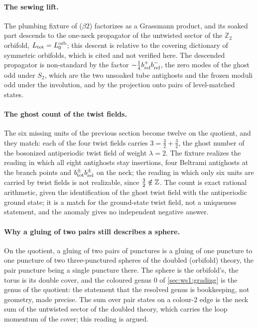 \paragraph{The sewing lift.}
The plumbing fixture of ($\beta 2$) factorizes as a Grassmann product, and its soaked part descends to the one-neck propagator of the untwisted sector of the $\mathbb Z_2$ orbifold, $L_{\rm tot} = L_0^{\rm orb}$; this descent is relative to the covering dictionary of symmetric orbifolds, which is cited and not verified here.
The descended propagator is non-standard by the factor $- \tfrac14 b^+_{\rm rel} b^-_{\rm rel}$, the zero modes of the ghost odd under $S_2$, which are the two unsoaked tube antighosts and the frozen moduli odd under the involution, and by the projection onto pairs of level-matched states.

\paragraph{The ghost count of the twist fields.}
The six missing units of the previous section become twelve on the quotient, and they match: each of the four twist fields carries $3 = \tfrac32 + \tfrac32$, the ghost number of the bosonized antiperiodic twist field of weight $\lambda = 2$.
The fixture realizes the reading in which all eight antighosts stay insertions, four Beltrami antighosts at the branch points and $b^\pm_{\rm tot} b^\pm_{\rm rel}$ on the neck; the reading in which only six units are carried by twist fields is not realizable, since $\tfrac32 \notin \mathbb{Z}$.
The count is exact rational arithmetic, given the identification of the ghost twist field with the antiperiodic ground state; it is a match for the ground-state twist field, not a uniqueness statement, and the anomaly gives no independent negative answer.

\paragraph{Why a gluing of two pairs still describes a sphere.}
On the quotient, a gluing of two pairs of punctures is a gluing of one puncture to one puncture of two three-punctured spheres of the doubled (orbifold) theory, the pair puncture being a single puncture there.
The sphere is the orbifold's, the torus is its double cover, and the coloured genus $0$ of \cref{sec:ws1:grading} is the genus of the quotient: the statement that the resolved genus is bookkeeping, not geometry, made precise.
The sum over pair states on a colour-$2$ edge is the neck sum of the untwisted sector of the doubled theory, which carries the loop momentum of the cover; this reading is argued.

